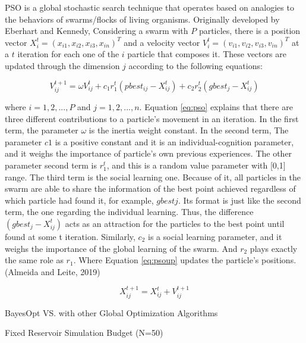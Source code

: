 \documentclass[]{elsarticle} %
\begin{document}
PSO is a global stochastic search technique that operates based on analogies to the behaviors of swarms/flocks of living organisms. Originally developed by Eberhart and Kennedy, Considering a swarm with \(P\) particles, there is a position vector \(X_{i}^{t}=(x_{i1},x_{i2}, x_{i3},x_{in})^T\) and a velocity vector \(V^t_i=(v_{i1},v_{i2},v_{i3},v_{in})^T\) at a \(t\) iteration for each one of the \(i\) particle that composes it. These vectors are updated through the dimension \(j\) according to the following equations:

\begin{equation}
V^{t+1}_{ij} = \omega V^{t}_{ij} + c_{1}r_{1}^{t}(pbest_{ij}-X_{ij}^t) + c_2r_2^t(gbest_j-X_{ij}^{t})
\label{eq:pso}
\end{equation}

where \(i=1,2,..., P\) and \(j =1,2,...,n\). Equation \eqref{eq:pso} explains that there are three different contributions to a particle's movement in an iteration. In the first term, the parameter \(\omega\) is the inertia weight constant. In the second term, The parameter \(c1\) is a positive constant and it is an individual-cognition parameter, and it weighs the importance of particle's own previous experiences. The other parameter second term is \(r_1^t\), and this is a random value parameter with {[}0,1{]} range. The third term is the social learning one. Because of it, all particles in the swarm are able to share the information of the best point achieved regardless of which particle had found it, for example, \(gbestj\). Its format is just like the second term, the one regarding the individual learning. Thus, the difference \((gbest_j - X^t_{ij})\) acts as an attraction for the particles to the best point until found at some t iteration. Similarly, \(c_2\) is a social learning parameter, and it weighs the importance of the global learning of the swarm. And \(r_2\) plays exactly the same role as \(r_1\). Where Equation \eqref{eq:psoup} updates the particle's positions. (Almeida and Leite, 2019)

\begin{equation}
X_{ij}^{t+1} = X_{ij}^{t} + V_{ij}^{t+1}
\label{eq:psoup}
\end{equation}

BayesOpt VS. with other Global Optimization Algorithms

Fixed Reservoir Simulation Budget (N=50)
\end{document}
